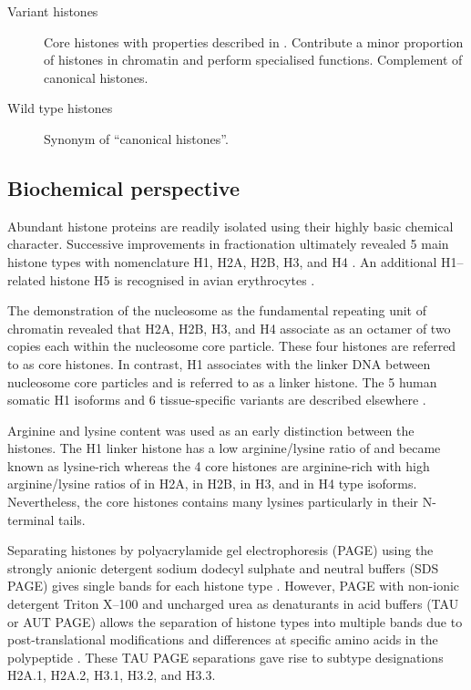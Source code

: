 {\begin{shaded}
\begin{description}
        \item[Variant histones] \hfill \newline
        Core histones with properties described in .
        Contribute a minor proportion of histones in chromatin and perform specialised functions.
        Complement of canonical histones.

        \item[Wild type histones] \hfill \newline
        Synonym of ``canonical histones''.
      \end{description}
    \end{shaded}
  }

  \subsection{Biochemical perspective}

    Abundant histone proteins are readily isolated using their
    highly basic chemical character.
    Successive improvements in fractionation ultimately revealed 5 main histone types
    with nomenclature H1, H2A, H2B, H3, and H4 \citep{nomenclature}.
    An additional H1--related histone H5 is recognised in avian erythrocytes \citep{HFive-review}.

    The demonstration of the nucleosome as the fundamental
    repeating unit of chromatin \citep{Kornberg1974}
    revealed that H2A, H2B, H3, and H4 associate as an octamer of two copies each within the
    nucleosome core particle. These four histones are referred to as core histones.
    In contrast, H1 associates with the linker DNA between nucleosome core particles
    and is referred to as a linker histone.
    The 5 human somatic H1 isoforms and 6 tissue-specific
    variants are described elsewhere \citep{HarshmanFreitas2013}.

    Arginine and lysine content was used as an early distinction between the histones.
    The H1 linker histone has a low arginine/lysine ratio
    of \LinkerArgLysRatio{} and became known as lysine-rich
    whereas the 4 core histones are arginine-rich
    with high arginine/lysine ratios of \HTwoAArgLysRatio{} in H2A, \HTwoBArgLysRatio{} in H2B,
    \HThreeArgLysRatio{} in H3, and \HFourArgLysRatio{} in H4 type isoforms.
    Nevertheless, the core histones contains many lysines particularly in their N-terminal tails.

    Separating histones by polyacrylamide gel electrophoresis (PAGE)
    using the strongly anionic detergent sodium dodecyl sulphate and neutral buffers (SDS PAGE)
    gives single bands for each histone type \citep{ShechterHake2007}.
    However, PAGE with non-ionic detergent Triton X--100 and uncharged urea as denaturants
    in acid buffers (TAU or AUT PAGE) allows the separation
    of histone types into multiple bands
    due to post-translational modifications and differences at specific amino acids
    in the polypeptide \citep{Zweidler1977}.
    These TAU PAGE separations gave rise to subtype designations
    H2A.1, H2A.2, H3.1, H3.2, and H3.3.


